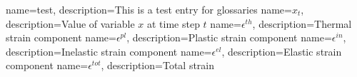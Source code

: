 
{
	name={test},
	description={This is a test entry for glossaries}
}
{
	name={\ensuremath{x_t}},
	description={Value of variable $x$ at time step \ensuremath{t}}
}
{
	name={\ensuremath{\epsilon^{th}}},
	description={Thermal strain component}
}
{
	name={\ensuremath{\epsilon^{pl}}},
	description={Plastic strain component}
}
{
	name={\ensuremath{\epsilon^{in}}},
	description={Inelastic strain component}
}
{
	name={\ensuremath{\epsilon^{el}}},
	description={Elastic strain component}
}
{
	name={\ensuremath{\epsilon^{tot}}},
	description={Total strain}
}
